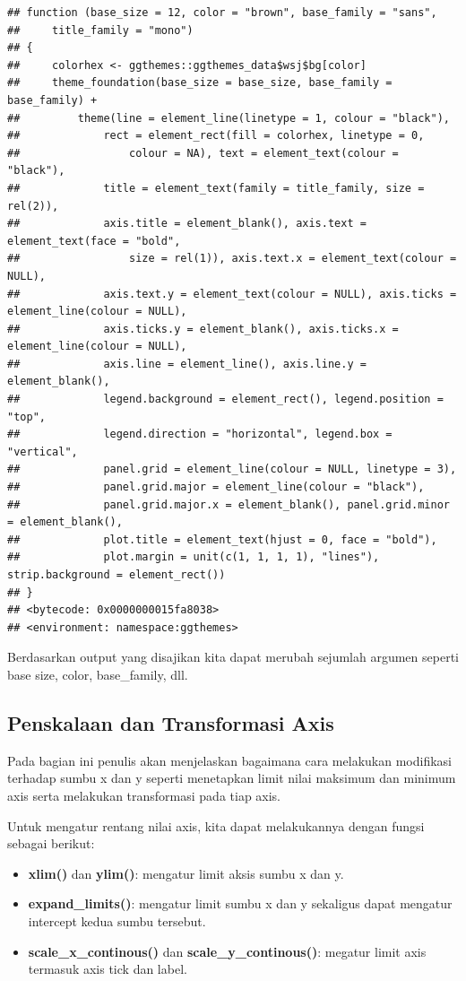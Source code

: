 \documentclass[]{book}
\providecommand{\tightlist}{%
  \setlength{\itemsep}{0pt}\setlength{\parskip}{0pt}}
\begin{document}
\begin{verbatim}
## function (base_size = 12, color = "brown", base_family = "sans", 
##     title_family = "mono") 
## {
##     colorhex <- ggthemes::ggthemes_data$wsj$bg[color]
##     theme_foundation(base_size = base_size, base_family = base_family) + 
##         theme(line = element_line(linetype = 1, colour = "black"), 
##             rect = element_rect(fill = colorhex, linetype = 0, 
##                 colour = NA), text = element_text(colour = "black"), 
##             title = element_text(family = title_family, size = rel(2)), 
##             axis.title = element_blank(), axis.text = element_text(face = "bold", 
##                 size = rel(1)), axis.text.x = element_text(colour = NULL), 
##             axis.text.y = element_text(colour = NULL), axis.ticks = element_line(colour = NULL), 
##             axis.ticks.y = element_blank(), axis.ticks.x = element_line(colour = NULL), 
##             axis.line = element_line(), axis.line.y = element_blank(), 
##             legend.background = element_rect(), legend.position = "top", 
##             legend.direction = "horizontal", legend.box = "vertical", 
##             panel.grid = element_line(colour = NULL, linetype = 3), 
##             panel.grid.major = element_line(colour = "black"), 
##             panel.grid.major.x = element_blank(), panel.grid.minor = element_blank(), 
##             plot.title = element_text(hjust = 0, face = "bold"), 
##             plot.margin = unit(c(1, 1, 1, 1), "lines"), strip.background = element_rect())
## }
## <bytecode: 0x0000000015fa8038>
## <environment: namespace:ggthemes>
\end{verbatim}

Berdasarkan output yang disajikan kita dapat merubah sejumlah argumen
seperti base size, color, base\_family, dll.

\subsection{Penskalaan dan Transformasi
Axis}\label{penskalaan-dan-transformasi-axis}

Pada bagian ini penulis akan menjelaskan bagaimana cara melakukan
modifikasi terhadap sumbu x dan y seperti menetapkan limit nilai
maksimum dan minimum axis serta melakukan transformasi pada tiap axis.

Untuk mengatur rentang nilai axis, kita dapat melakukannya dengan fungsi
sebagai berikut:

\begin{itemize}
\tightlist
\item
  \textbf{xlim()} dan \textbf{ylim()}: mengatur limit aksis sumbu x dan
  y.
\item
  \textbf{expand\_limits()}: mengatur limit sumbu x dan y sekaligus
  dapat mengatur intercept kedua sumbu tersebut.
\item
  \textbf{scale\_x\_continous()} dan \textbf{scale\_y\_continous()}:
  megatur limit axis termasuk axis tick dan label.
\end{itemize}
\end{document}
